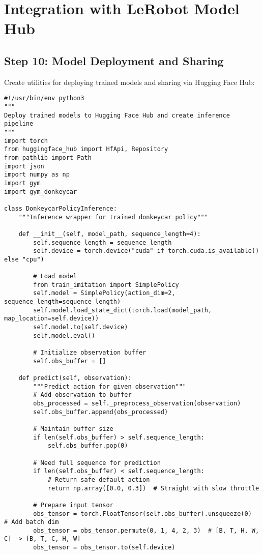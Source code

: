 \documentclass[11pt,a4paper]{article}
\begin{document}
\section{Integration with LeRobot Model Hub}

\subsection{Step 10: Model Deployment and Sharing}

Create utilities for deploying trained models and sharing via Hugging Face Hub:

\begin{lstlisting}[style=pythonstyle, caption={Model deployment utilities (deploy\_model.py)}]
#!/usr/bin/env python3
"""
Deploy trained models to Hugging Face Hub and create inference pipeline
"""
import torch
from huggingface_hub import HfApi, Repository
from pathlib import Path
import json
import numpy as np
import gym
import gym_donkeycar

class DonkeycarPolicyInference:
    """Inference wrapper for trained donkeycar policy"""
    
    def __init__(self, model_path, sequence_length=4):
        self.sequence_length = sequence_length
        self.device = torch.device("cuda" if torch.cuda.is_available() else "cpu")
        
        # Load model
        from train_imitation import SimplePolicy
        self.model = SimplePolicy(action_dim=2, sequence_length=sequence_length)
        self.model.load_state_dict(torch.load(model_path, map_location=self.device))
        self.model.to(self.device)
        self.model.eval()
        
        # Initialize observation buffer
        self.obs_buffer = []
    
    def predict(self, observation):
        """Predict action for given observation"""
        # Add observation to buffer
        obs_processed = self._preprocess_observation(observation)
        self.obs_buffer.append(obs_processed)
        
        # Maintain buffer size
        if len(self.obs_buffer) > self.sequence_length:
            self.obs_buffer.pop(0)
        
        # Need full sequence for prediction
        if len(self.obs_buffer) < self.sequence_length:
            # Return safe default action
            return np.array([0.0, 0.3])  # Straight with slow throttle
        
        # Prepare input tensor
        obs_tensor = torch.FloatTensor(self.obs_buffer).unsqueeze(0)  # Add batch dim
        obs_tensor = obs_tensor.permute(0, 1, 4, 2, 3)  # [B, T, H, W, C] -> [B, T, C, H, W]
        obs_tensor = obs_tensor.to(self.device)
        

\end{lstlisting}
\end{document}
